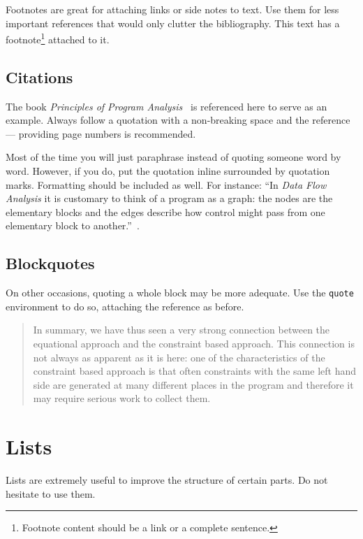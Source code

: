 Footnotes are great for attaching links or side notes to text.
Use them for less important references that would only clutter the bibliography.
This text has a footnote\footnote{Footnote content should be a link or a complete sentence.} attached to it.

\subsection{Citations}

The book \emph{Principles of Program Analysis}~\cite{Nielson:ppa} is referenced here to serve as an example.
Always follow a quotation with a non-breaking space and the reference --- providing page numbers is recommended.

Most of the time you will just paraphrase instead of quoting someone word by word.
However, if you do, put the quotation inline surrounded by quotation marks.
Formatting should be included as well.
For instance: ``In \emph{Data Flow Analysis} it is customary to think of a program as a graph: the nodes are the elementary blocks and the edges describe how control might pass from one elementary block to another.''~\cite[p.~5]{Nielson:ppa}.

\subsection{Blockquotes}

On other occasions, quoting a whole block may be more adequate.
Use the \texttt{quote} environment to do so, attaching the reference as before.

\begin{quote}
	In summary, we have thus seen a very strong connection between the equational approach and the constraint based approach.
	This connection is not always as apparent as it is here: one of the characteristics of the constraint based approach is that often constraints with the same left hand side are generated at many different places in the program and therefore it may require serious work to collect them.~\cite[p.~10]{Nielson:ppa}
\end{quote}

\section{Lists}

Lists are extremely useful to improve the structure of certain parts.
Do not hesitate to use them.

